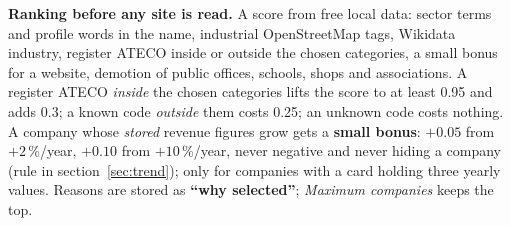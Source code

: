 \textbf{Ranking before any site is read.} A score from free local data: sector terms and profile words in the name,
industrial OpenStreetMap tags, Wikidata industry, register ATECO inside or outside the chosen categories, a small
bonus for a website, demotion of public offices, schools, shops and associations.
A register ATECO \emph{inside} the chosen categories lifts the score to at least 0.95 and
adds 0.3; a known code \emph{outside} them costs 0.25; an unknown code costs nothing.
A company whose \emph{stored} revenue figures grow gets a \textbf{small bonus}: $+0.05$ from
$+2$\,\%/year, $+0.10$ from $+10$\,\%/year, never negative and never hiding a company
(rule in section~\ref{sec:trend}); only for companies with a card holding three yearly values. Reasons are stored as \textbf{``why selected''}; \emph{Maximum companies} keeps the top.
